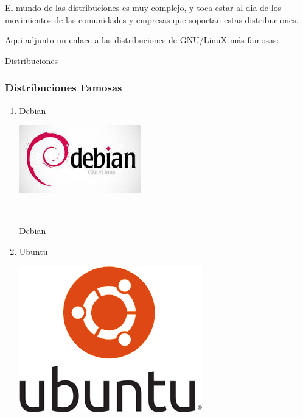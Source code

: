 \documentclass[11pt]{article}
\begin{document}
El mundo de las distribuciones es muy complejo, y toca estar al dia de
los movimientos de las comunidades y empresas que soportan estas
distribuciones.

Aqui adjunto un enlace a las distribuciones de GNU/LinuX más famosas:

\href{https://upload.wikimedia.org/wikipedia/commons/1/1b/Linux\_Distribution\_Timeline.svg}{Distribuciones}

\subsubsection{Distribuciones Famosas}
\label{sec:orgd6b56c6}
\begin{enumerate}
\item Debian
\label{sec:orga0a2238}
\begin{center}
\includegraphics[width=.9\linewidth]{Versiones/debian.jpeg}
\end{center}  

\href{https://www.debian.org/intro/about\#what}{Debian}

\item Ubuntu
\label{sec:org3c666e1}
\begin{center}
\includegraphics[width=.9\linewidth]{Versiones/ubuntu-logo.png}
\end{center}


\end{enumerate}
\end{document}
